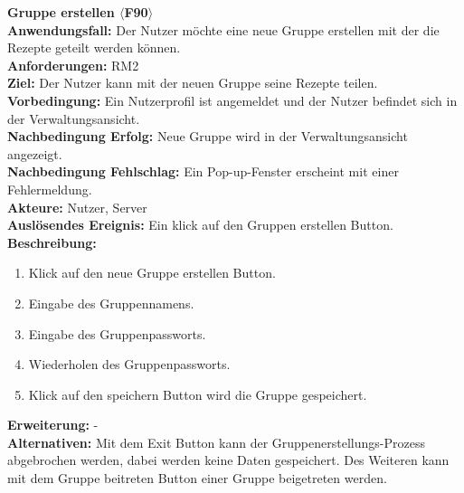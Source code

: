 \documentclass[parskip=full]{scrartcl}
\begin{document}
\textbf{Gruppe erstellen $\langle$F90$\rangle$}\\
\textbf{Anwendungsfall:} Der Nutzer möchte eine neue Gruppe erstellen mit der die Rezepte geteilt werden können. \\
\textbf{Anforderungen:} RM2 \\
\textbf{Ziel:} Der Nutzer kann mit der neuen Gruppe seine Rezepte teilen.\\
\textbf{Vorbedingung:} Ein Nutzerprofil ist angemeldet und der Nutzer befindet sich in der Verwaltungsansicht.\\
\textbf{Nachbedingung Erfolg:} Neue Gruppe wird in der Verwaltungsansicht angezeigt.\\
\textbf{Nachbedingung Fehlschlag:} Ein Pop-up-Fenster erscheint mit einer Fehlermeldung.\\
\textbf{Akteure:} Nutzer, Server\\
\textbf{Auslösendes Ereignis:} Ein klick auf den Gruppen erstellen Button.\\
\textbf{Beschreibung:}
\begin{enumerate}
    \item Klick auf den neue Gruppe erstellen Button.
    \item Eingabe des Gruppennamens.
    \item Eingabe des Gruppenpassworts.
    \item Wiederholen des Gruppenpassworts.
    \item Klick auf den speichern Button wird die Gruppe gespeichert.
\end{enumerate}
\textbf{Erweiterung:} -\\
\textbf{Alternativen:} Mit dem Exit Button kann der Gruppenerstellungs-Prozess abgebrochen werden, dabei werden keine Daten gespeichert. Des Weiteren kann mit dem Gruppe beitreten Button einer Gruppe beigetreten werden.\\
\newpage
\end{document}
